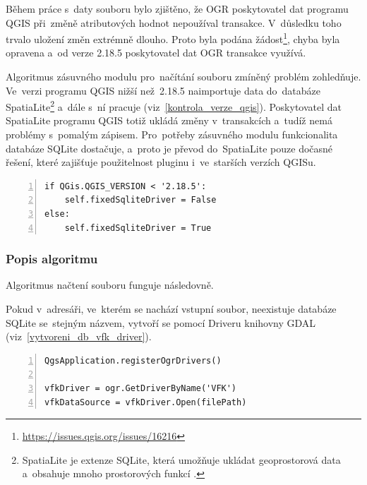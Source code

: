 Během práce s~daty souboru  bylo zjištěno, že OGR poskytovatel dat programu QGIS při~změně atributových hodnot nepoužíval transakce. V~důsledku toho trvalo uložení změn extrémně dlouho. Proto byla podána žádost\footnote{\url{https://issues.qgis.org/issues/16216}}, chyba byla opravena a~od verze 2.18.5 poskytovatel dat OGR transakce využívá.

Algoritmus zásuvného modulu pro~načítání  souboru zmíněný problém zohledňuje. Ve~verzi programu QGIS nižší než~2.18.5 naimportuje data do~databáze SpatiaLite\footnote{SpatiaLite je extenze SQLite, která umožňuje ukládat geoprostorová data a~obsahuje mnoho prostorových funkcí \citep{spatialite} \citep{wiki_spatialite}.} a~dále s~ní pracuje (viz~\ref{kontrola_verze_qgis}). Poskytovatel dat SpatiaLite programu QGIS totiž ukládá změny v~transakcích a~tudíž nemá problémy s~pomalým zápisem. Pro~potřeby zásuvného modulu funkcionalita databáze SQLite dostačuje, a~proto je převod do~SpatiaLite pouze dočasné řešení, které zajišťuje použitelnost pluginu i~ve~starších verzích QGISu.

{\scriptsize
\begin{lstlisting}[style=python, caption={Kontrola verze programu QGIS}, captionpos=b, label=kontrola_verze_qgis, backgroundcolor = \color{light-gray},  numbers=left]
if QGis.QGIS_VERSION < '2.18.5':
    self.fixedSqliteDriver = False
else:
    self.fixedSqliteDriver = True
\end{lstlisting}}

\subsubsection{Popis algoritmu}
\label{popis_algoritmu_nacteni_vfk}

Algoritmus načtení  souboru funguje následovně.

Pokud v~adresáři, ve~kterém se nachází vstupní  soubor, neexistuje databáze SQLite se~stejným názvem, vytvoří se pomocí  Driveru knihovny GDAL (viz~\ref{vytvoreni_db_vfk_driver}).

{\scriptsize
\begin{lstlisting}[style=python, caption={Vytvoření SQLite databáze pomocí VFK Driveru}, captionpos=b, label=vytvoreni_db_vfk_driver, backgroundcolor = \color{light-gray},  numbers=left]
QgsApplication.registerOgrDrivers()

vfkDriver = ogr.GetDriverByName('VFK')
vfkDataSource = vfkDriver.Open(filePath)
\end{lstlisting}}

